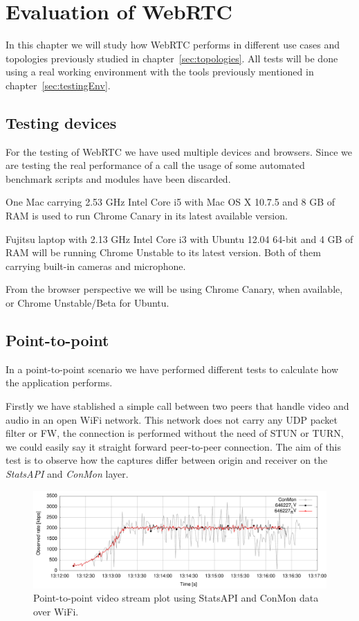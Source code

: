 \section{Evaluation of WebRTC}

\thispagestyle{empty}

In this chapter we will study how WebRTC performs in different use cases and topologies previously studied in chapter~\ref{sec:topologies}. All tests will be done using a real working environment with the tools previously mentioned in chapter~\ref{sec:testingEnv}.

\subsection{Testing devices}

For the testing of WebRTC we have used multiple devices and browsers. Since we are testing the real performance of a call the usage of some automated benchmark scripts and modules have been discarded.

One Mac carrying 2.53 GHz Intel Core i5 with Mac OS X 10.7.5 and 8 GB of RAM is used to run Chrome Canary in its latest available version. 

Fujitsu laptop with 2.13 GHz Intel Core i3 with Ubuntu 12.04 64-bit and 4 GB of RAM will be running Chrome Unstable to its latest version. Both of them carrying built-in cameras and microphone.

From the browser perspective we will be using Chrome Canary, when available, or Chrome Unstable/Beta for Ubuntu.

\subsection{Point-to-point}

In a point-to-point scenario we have performed different tests to calculate how the application performs. 

Firstly we have stablished a simple call between two peers that handle video and audio in an open WiFi network. This network does not carry any UDP packet filter or FW, the connection is performed without the need of STUN or TURN, we could easily say it straight forward peer-to-peer connection. The aim of this test is to observe how the captures differ between origin and receiver on the {\it StatsAPI} and {\it ConMon} layer.

 \begin{figure}[h]
  \centering
    \includegraphics[width=1\textwidth]{./figures/onetoone_wifi_statsconmon.pdf}
      \caption[Point-to-point video stream plot using StatsAPI and ConMon data over WiFi]{Point-to-point video stream plot using StatsAPI and ConMon data over WiFi.}
	\label{fig:onetooneWifistatsconmon}
\end{figure}

